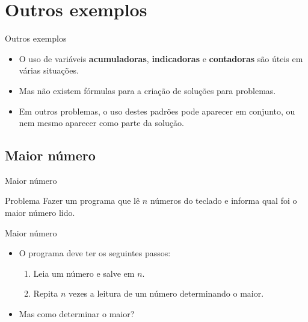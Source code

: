 \documentclass[handout]{beamer}
\begin{document}
\section{Outros exemplos}

\begin{frame}{Outros exemplos}

    \begin{itemize}[<+->]
        \item O uso de variáveis {\bf acumuladoras}, {\bf indicadoras} e {\bf contadoras} são úteis em várias situações.
        \item Mas não existem fórmulas para a criação de soluções para problemas.
        \item Em outros problemas, o uso destes padrões pode aparecer em conjunto, ou nem mesmo aparecer como parte da solução.
    \end{itemize}
\end{frame}


\subsection{Maior número}%

\begin{frame}{Maior número}
    \begin{block}{Problema}
        Fazer um programa que lê $n$ números do teclado e informa qual foi o maior número lido.
    \end{block}
\end{frame}

\begin{frame}{Maior número}
    \begin{itemize}
        \item O programa deve ter os seguintes passos:
        \begin{enumerate}
            \item Leia um número e salve em $n$.
            \item Repita $n$ vezes a leitura de um número determinando o maior.
        \end{enumerate}
        \item Mas como determinar o maior?
    \end{itemize}
\end{frame}
\end{document}
